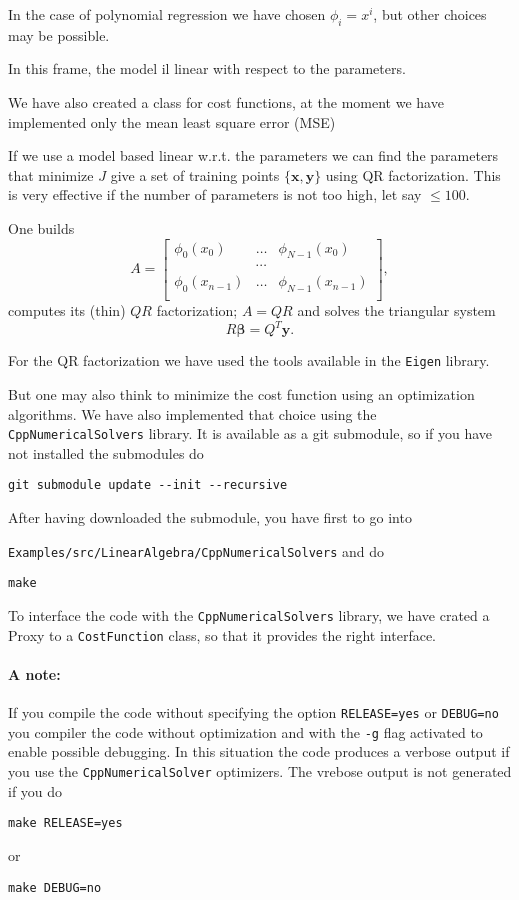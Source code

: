 \documentclass{article}
\begin{document}
In the case of polynomial regression we have chosen $\phi_i=x^i$, but other choices may be possible.

In this frame, the model il linear with respect to the parameters.

We have also created a class for cost functions, at the moment we have implemented only the mean least square error (MSE)

If we use a model based linear w.r.t. the parameters we can find the parameters that minimize $J$ give a set of training points $\{\mathbf{x},\mathbf{y}\}$
using QR factorization. This is very effective if the number of parameters is not too high, let say $\le 100$.

One builds
\[
A=\begin{bmatrix}
\phi_0(x_0)&\ldots&\phi_{N-1}(x_{0})\\
&\cdots &\\
\phi_0(x_{n-1})&\ldots&\phi_{N-1}(x_{n-1})\\
\end{bmatrix},
\]
computes its (thin) $QR$ factorization; $A=QR$ and solves the triangular system
\[
R\boldsymbol{\beta}=Q^T\mathbf{y}.
\]

For the QR factorization we have used the tools available in the \texttt{Eigen} library.

But one may also think to minimize the cost function using an optimization algorithms.
We have also implemented that choice using the \texttt{CppNumericalSolvers} library. It is available as a git submodule, so if you have not installed the submodules
do
\begin{verbatim}
git submodule update --init --recursive
\end{verbatim}

After having downloaded the submodule, you have first to go into

\texttt{Examples/src/LinearAlgebra/CppNumericalSolvers} and do
\begin{verbatim}
make
\end{verbatim}

To interface the code with the \texttt{CppNumericalSolvers} library, we have crated a Proxy to a \texttt{CostFunction} class, so that it provides the right interface.

\paragraph{A note:} If you compile the code without specifying the option \texttt{RELEASE=yes} or \texttt{DEBUG=no} you compiler the code without optimization and with the \texttt{-g} flag
activated to enable possible debugging. In this situation the code produces a verbose output if you use the \texttt{CppNumericalSolver} optimizers. The vrebose output is not generated if you
do
\begin{verbatim}
make RELEASE=yes
\end{verbatim}
or
\begin{verbatim}
make DEBUG=no
\end{verbatim}
\end{document}
